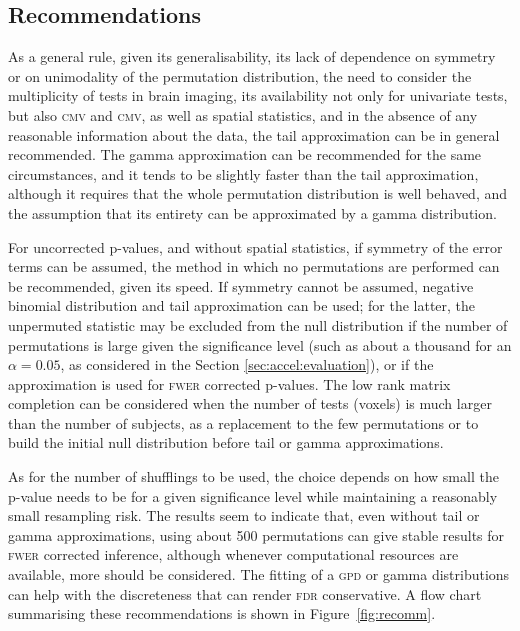 \subsection{Recommendations}

As a general rule, given its generalisability, its lack of dependence on symmetry or on unimodality of the permutation distribution, the need to consider the multiplicity of tests in brain imaging, its availability not only for univariate tests, but also \textsc{cmv} and \textsc{cmv}, as well as spatial statistics, and in the absence of any reasonable information about the data, the tail approximation can be in general recommended. The gamma approximation can be recommended for the same circumstances, and it tends to be slightly faster than the tail approximation, although it requires that the whole permutation distribution is well behaved, and the assumption that its entirety can be approximated by a gamma distribution.

For uncorrected p-values, and without spatial statistics, if symmetry of the error terms can be assumed, the method in which no permutations are performed can be recommended, given its speed. If symmetry cannot be assumed, negative binomial distribution and tail approximation can be used; for the latter, the unpermuted statistic may be excluded from the null distribution if the number of permutations is large given the significance level (such as about a thousand for an $\alpha=0.05$, as considered in the Section  \ref{sec:accel:evaluation}), or if the approximation is used for \textsc{fwer} corrected p-values. The low rank matrix completion can be considered when the number of tests (voxels) is much larger than the number of subjects, as a replacement to the few permutations or to build the initial null distribution before tail or gamma approximations.

As for the number of shufflings to be used, the choice depends on how small the p-value needs to be for a given significance level while maintaining a reasonably small resampling risk. The results seem to indicate that, even without tail or gamma approximations, using about 500 permutations can give stable results for \textsc{fwer} corrected inference, although whenever computational resources are available, more should be considered. The fitting of a \textsc{gpd} or gamma distributions can help with the discreteness that can render \textsc{fdr} conservative. A flow chart summarising these recommendations is shown in Figure~\ref{fig:recomm}.

